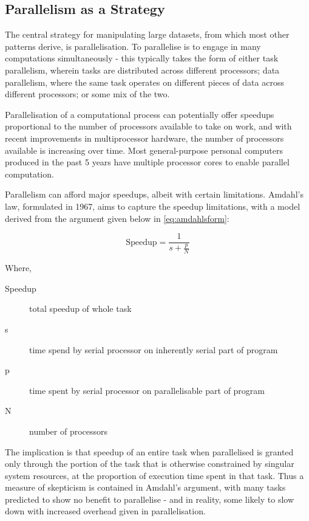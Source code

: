 \hypertarget{sec:parallel}{%
	\subsection{Parallelism as a Strategy}\label{sec:parallel}}

The central strategy for manipulating large datasets, from which most
other patterns derive, is parallelisation. To parallelise is to engage
in many computations simultaneously - this typically takes the form of
either task parallelism, wherein tasks are distributed across different
processors; data parallelism, where the same task operates on different
pieces of data across different processors; or some mix of the two.

Parallelisation of a computational process can potentially offer
speedups proportional to the number of processors available to take on
work, and with recent improvements in multiprocessor hardware, the
number of processors available is increasing over time. Most
general-purpose personal computers produced in the past 5 years have
multiple processor cores to enable parallel computation.

Parallelism can afford major speedups, albeit with certain limitations.
Amdahl's law, formulated in 1967, aims to capture the speedup
limitations, with a model derived from the argument given below in
\ref{eq:amdahlsform}\cite{amdahl1967law}\cite{gustafson1988law}:

\begin{equation*}\label{eq:amdahlsform}
	\textrm{Speedup} = \frac{1}{s+\frac{p}{N}}
\end{equation*}

Where,

\begin{description}
	\item[Speedup] total speedup of whole task
	\item[s] time spend by serial processor on inherently serial part of program
	\item[p] time spent by serial processor on parallelisable part of program
	\item[N] number of processors
\end{description}

The implication is that speedup of an entire task when parallelised is
granted only through the portion of the task that is otherwise
constrained by singular system resources, at the proportion of execution
time spent in that task. Thus a measure of skepticism is contained in
Amdahl's argument, with many tasks predicted to show no benefit to
parallelise - and in reality, some likely to slow down with increased
overhead given in parallelisation.

